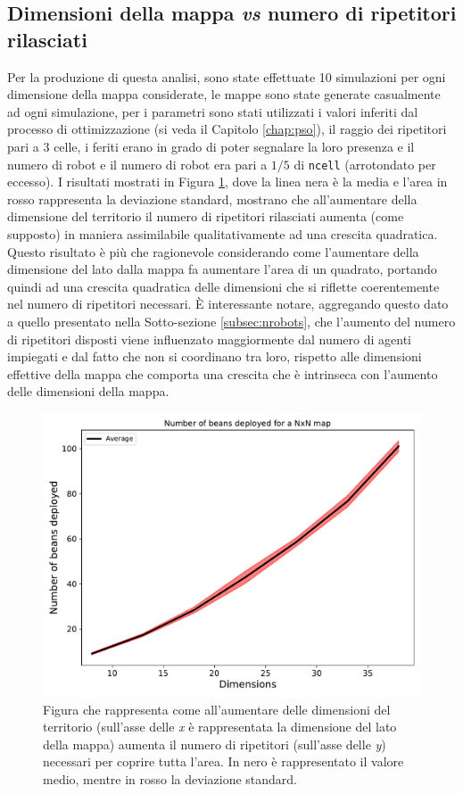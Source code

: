 \subsection{Dimensioni della mappa \textit{vs} numero di ripetitori rilasciati}
Per la produzione di questa analisi, sono state effettuate 10 simulazioni per ogni dimensione della mappa considerate, le mappe sono state generate casualmente ad ogni simulazione, per i parametri sono stati utilizzati i valori inferiti dal processo di ottimizzazione (si veda il Capitolo \ref{chap:pso}), il raggio dei ripetitori pari a 3 celle, i feriti erano in grado di poter segnalare la loro presenza e il numero di robot e il numero di robot era pari a $1/5$ di \texttt{ncell} (arrotondato per eccesso).
I risultati mostrati in Figura \ref{fig:beans}, dove la linea nera è la media e l'area in rosso rappresenta la deviazione standard, mostrano che all'aumentare della dimensione del territorio il numero di ripetitori rilasciati aumenta (come supposto) in maniera assimilabile qualitativamente ad una crescita quadratica.
Questo risultato è più che ragionevole considerando come l'aumentare della dimensione del lato dalla mappa fa aumentare l'area di un quadrato, portando quindi ad una crescita quadratica delle dimensioni che si riflette coerentemente nel numero di ripetitori necessari.
È interessante notare, aggregando questo dato a quello presentato nella Sotto-sezione \ref{subsec:nrobots}, che l'aumento del numero di ripetitori disposti viene influenzato maggiormente dal numero di agenti impiegati e dal fatto che non si coordinano tra loro, rispetto alle dimensioni effettive della mappa che comporta una crescita che è intrinseca con l'aumento delle dimensioni della mappa.
\begin{figure}
	\centering
	\includegraphics[width=0.9\linewidth]{images/macro_results/beans}
	\caption{Figura che rappresenta come all'aumentare delle dimensioni del territorio (sull'asse delle \textit{x} è rappresentata la dimensione del lato della mappa) aumenta il numero di ripetitori (sull'asse delle \textit{y}) necessari per coprire tutta l'area. In nero è rappresentato il valore medio, mentre in rosso la deviazione standard.}
	\label{fig:beans}
\end{figure}

